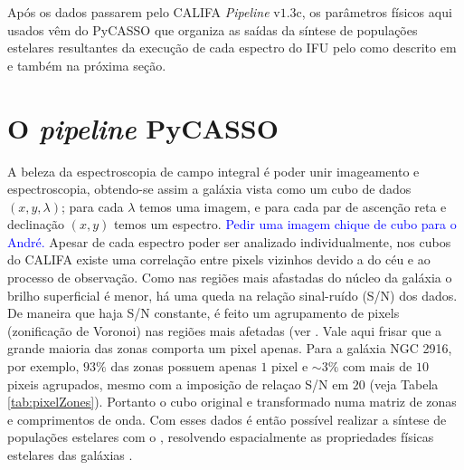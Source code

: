 Após os dados passarem pelo CALIFA {\em Pipeline} v$1.3$c, os parâmetros físicos
aqui usados vêm do PyCASSO que organiza as saídas da síntese de populações
estelares resultantes da execução de cada espectro do IFU pelo \starlight
\citep{CidFernandes2005} como descrito em \citet{CidFernandes2013I} e também na
próxima seção.


\section{O {\em pipeline} PyCASSO}
\label{sec:CALePyC:PyCASSO}

A beleza da espectroscopia de campo integral é poder unir imageamento e
espectroscopia, obtendo-se assim a galáxia vista como um cubo de dados  $(x, y,
\lambda)$; para cada $\lambda$ temos uma imagem, e para cada par de ascenção
reta e declinação $(x, y)$ temos um espectro. \ojo \textcolor{blue}{Pedir uma
imagem chique de cubo para o André.} Apesar de cada espectro poder ser analizado
individualmente, nos cubos do CALIFA existe uma correlação entre pixels vizinhos
devido a  do céu e ao processo de observação. Como nas regiões
mais afastadas do núcleo da galáxia o brilho superficial é menor, há uma queda
na relação sinal-ruído (S/N) dos dados. De maneira que haja S/N constante, é
feito um agrupamento de pixels (zonificação de Voronoi) nas regiões mais
afetadas (ver \citep[][sec. 3]{CidFernandes2013I}. Vale aqui frisar que a grande
maioria das zonas comporta um pixel apenas. Para a galáxia NGC 2916, por
exemplo, $93\%$ das zonas possuem apenas $1$ pixel e $\sim 3\%$ com mais de $10$
pixeis agrupados, mesmo com a imposição de relaçao S/N em $20$ (veja Tabela
\ref{tab:pixelZones}). Portanto o cubo original e transformado numa matriz de
zonas e comprimentos de onda. Com esses dados é então possível realizar a
síntese de populações estelares com o \starlight, resolvendo espacialmente as
propriedades físicas estelares das galáxias \citep{CidFernandes2013I,
CidFernandes2013II, GonzalezDelgado2013}.

